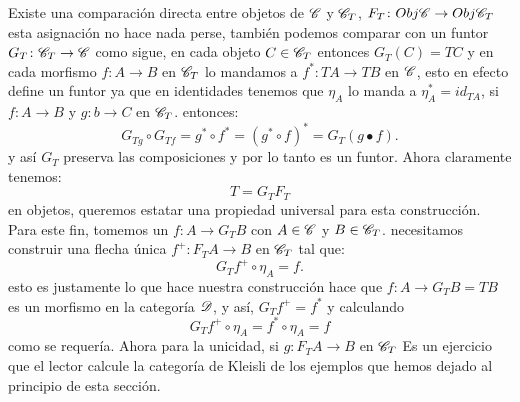\documentclass{comunicaciones}
\begin{document}
Existe una comparación directa entre objetos de $\EuScript{C}$ y $\EuScript{C}_{T}$, $F_{T}\colon Obj\EuScript{C}\rightarrow Obj\EuScript{C}_{T}$ esta asignación no hace nada perse, también podemos comparar con un funtor
$G_{T}\colon\EuScript{C}_{T}\rightarrow\EuScript{C}$ como sigue, en cada objeto $C\in\EuScript{C}_{T}$ entonces $G_{T}(C)=TC $ y en cada morfismo $f\colon A\rightarrow B$ en $\EuScript{C}_{T}$
lo mandamos a $f^{*}\colon TA\rightarrow TB$ en $\EuScript{C}$, esto en efecto define un funtor ya que en identidades tenemos que $\eta_{A}$ lo manda a $\eta_{A}^{*}=id_{TA}$, si $f\colon A\rightarrow B$ y $g\colon b\rightarrow C$ en $\EuScript{C}_{T}$.
entonces: \[G_{Tg}\circ G_{Tf}=g^{*}\circ f^{*}=(g^{*}\circ f)^{*}=G_{T}(g\bullet f).\] y así $G_{T}$ preserva las composiciones y por lo tanto es un funtor.
Ahora claramente tenemos: \[T=G_{T}F_{T}\] en objetos, queremos estatar una propiedad universal para esta construcción.
Para este fin, tomemos un $f\colon A\rightarrow G_{T}B$ con $A\in\EuScript{C}$ y $B\in\EuScript{C}_{T}$. necesitamos construir una flecha única $f^{+}\colon F_{T}A\rightarrow B$ en $\EuScript{C}_{T}$ tal que:
\[G_{T}f^{+}\circ\eta_{A}=f.\] esto es justamente lo que hace nuestra construcción hace que $f\colon A\rightarrow G_{T}B=TB$ es un morfismo en la categoría $\EuScript{D}$, y así,
$G_{T}f^{+}=f^{*}$ y calculando \[G_{T}f^{+}\circ\eta_{A}=f^{*}\circ\eta_{A}=f\] como se requería. Ahora para la unicidad, si $g\colon F_{T}A\rightarrow B$ en $\EuScript{C}_{T}$ 
Es un ejercicio que el lector calcule la categoría de Kleisli de los ejemplos que hemos dejado al principio de esta sección.
\end{document}
